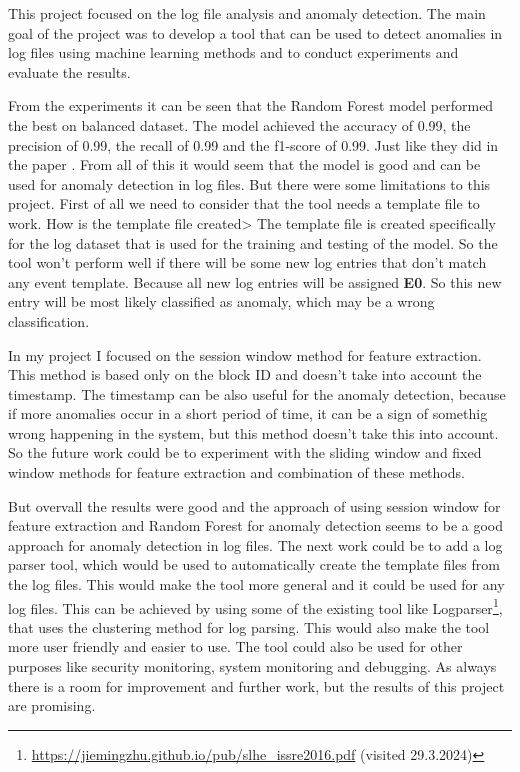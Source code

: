 This project focused on the log file analysis and anomaly detection.
The main goal of the project was to develop a tool that can be used to detect anomalies in log files using machine learning methods and to conduct experiments and evaluate the results.

From the experiments it can be seen that the Random Forest model performed the best on balanced dataset. The model achieved the accuracy of 0.99, the precision of 0.99, the recall of 0.99 and the f1-score of 0.99.
Just like they did in the paper \cite{goat}.
From all of this it would seem that the model is good and can be used for anomaly detection in log files. But there were some limitations to this project. 
First of all we need to consider that the tool needs a template file to work. How is the template file created> The template file is created specifically for the log dataset that is used for the training and testing of the model.
So the tool won't perform well if there will be some new log entries that don't match any event template. Because all new log entries will be assigned \textbf{E0}. So this new entry will be most likely classified as anomaly, which 
may be a wrong classification.

In my project I focused on the session window method for feature extraction. This method is based only on the block ID and doesn't take into account the timestamp. 
The timestamp can be also useful for the anomaly detection, because if more anomalies occur in a short period of time, it can be a sign of somethig wrong happening in the system, but this method doesn't take this into account. 
So the future work could be to experiment with the sliding window and fixed window methods for feature extraction and combination of these methods.

But overvall the results were good and the approach of using session window for feature extraction and Random Forest for anomaly detection seems to be a good approach for anomaly detection in log files.
The next work could be to add a log parser tool, which would be used to automatically create the template files from the log files. This would make the tool more general and it could be used for any log files.
This can be achieved by using some of the existing tool like Logparser\footnote{\url{https://jiemingzhu.github.io/pub/slhe_issre2016.pdf} (visited 29.3.2024)}, that uses the clustering method for log parsing.
This would also make the tool more user friendly and easier to use. The tool could also be used for other purposes like security monitoring, system monitoring and debugging. As always there is a room for 
improvement and further work, but the results of this project are promising.


% 